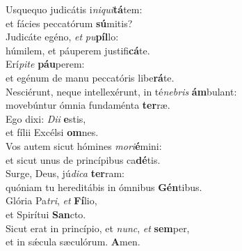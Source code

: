 \evenverse Usquequo judicátis i\textit{ni}\textit{qui}\textbf{tá}tem:~\*\\
\evenverse et fácies peccatórum \textbf{sú}mitis?\\
\oddverse Judicáte egéno, \textit{et} \textit{pu}\textbf{píl}lo:~\*\\
\oddverse húmilem, et páuperem justifi\textbf{cá}te.\\
\evenverse Erí\textit{pi}\textit{te} \textbf{páu}perem:~\*\\
\evenverse et egénum de manu peccatóris libe\textbf{rá}te.\\
\oddverse Nesciérunt, neque intellexérunt, in té\textit{ne}\textit{bris} \textbf{ám}bulant:~\*\\
\oddverse movebúntur ómnia fundaménta \textbf{ter}ræ.\\
\evenverse Ego dixi: \textit{Di}\textit{i} \textbf{e}stis,~\*\\
\evenverse et fílii Excélsi \textbf{om}nes.\\
\oddverse Vos autem sicut hómines \textit{mo}\textit{ri}\textbf{é}mini:~\*\\
\oddverse et sicut unus de princípibus ca\textbf{dé}tis.\\
\evenverse Surge, Deus, jú\textit{di}\textit{ca} \textbf{ter}ram:~\*\\
\evenverse quóniam tu hereditábis in ómnibus \textbf{Gén}tibus.\\
\oddverse Glória Pa\textit{tri}, \textit{et} \textbf{Fí}lio,~\*\\
\oddverse et Spirítui \textbf{San}cto.\\
\evenverse Sicut erat in princípio, et \textit{nunc}, \textit{et} \textbf{sem}per,~\*\\
\evenverse et in sǽcula sæculórum. \textbf{A}men.\\
